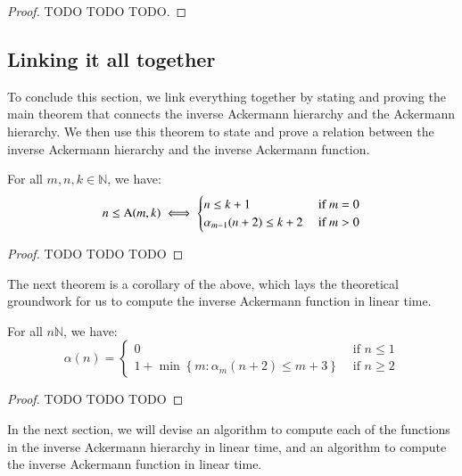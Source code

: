 \begin{proof} TODO TODO TODO.
%
%
\end{proof}

\subsection{Linking it all together}

To conclude this section, we link everything together by 
stating and proving the main theorem that connects the 
inverse Ackermann hierarchy and the Ackermann hierarchy. 
We then use this theorem to state and prove a relation 
between the inverse Ackermann hierarchy and the inverse 
Ackermann function.

\begin{thm}  \label{thm: inv_ack_ack}
For all $m, n, k \in \mathbb{N}$, we have:
\begin{equation}
n \le \text{A}(m, k) \iff \begin{cases}
n \le k + 1 & \text{ if } m = 0 \\ \alpha_{m-1}(n+2) \le k + 2 & \text{ if } m > 0
\end{cases}
\end{equation}
\end{thm}


\begin{proof}
TODO TODO TODO
\end{proof}

The next theorem is a corollary of the above, which lays the 
theoretical groundwork for us to compute the inverse Ackermann 
function in linear time.

\begin{thm}
For all $n\mathbb{N}$, we have:
\begin{equation}
\alpha(n) = \begin{cases}
0 & \text{ if } n \le 1 \\
1 + \min\left\{ m: \alpha_m(n+2) \le m + 3 \right\} & \text{ if } n \ge 2
\end{cases}
\end{equation}
\end{thm}

\begin{proof}
TODO TODO TODO
\end{proof}

In the next section, we will devise an algorithm to compute each 
of the functions in the inverse Ackermann hierarchy in linear time, 
and an algorithm to compute the inverse Ackermann function in linear time.

\fi